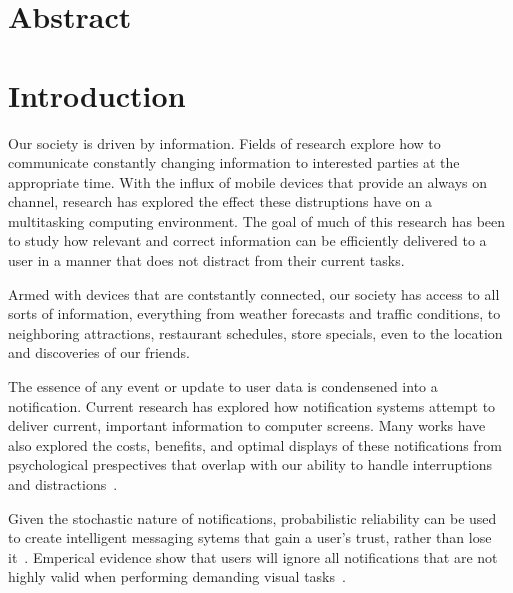\documentclass[12pt]{report}
\begin{document}
\newpage
\chapter{Abstract}

\newpage
\renewcommand{\thepage }{\arabic{page}}
\setcounter{page}{1}
\chapter{Introduction}

Our society is driven by information.  Fields of research explore how to communicate constantly
changing information to interested parties at the appropriate time.  With the influx of mobile
devices that provide an always on channel, research has explored the effect these distruptions have
on a multitasking computing environment.  The goal of much of this research has been to study how
relevant and correct information can be efficiently delivered to a user in a manner that does not
distract from their current tasks\cite{McCrickard2003509}.

Armed with devices that are contstantly connected, our society has access to all sorts of information,
everything from weather forecasts and traffic conditions, to neighboring attractions,
restaurant schedules, store specials, even to the location and discoveries of our friends.

The essence of any event or update to user data is condensened into a notification.  Current
research has explored how notification systems attempt to deliver current, important information
to computer screens.  Many works have also explored the costs, benefits,
and optimal displays of these notifications from psychological prespectives that overlap
with our ability to handle interruptions and distractions~\cite{McCrickard2003509, cutrell2001notification}.

Given the stochastic nature of notifications, probabilistic reliability can be used to create
intelligent messaging sytems that gain a user's trust, rather than lose it~\cite{leetiernan2001effective}.
Emperical evidence show that users will ignore all notifications that are not highly valid when
performing demanding visual tasks~\cite{maltz2000cue}.
\end{document}
